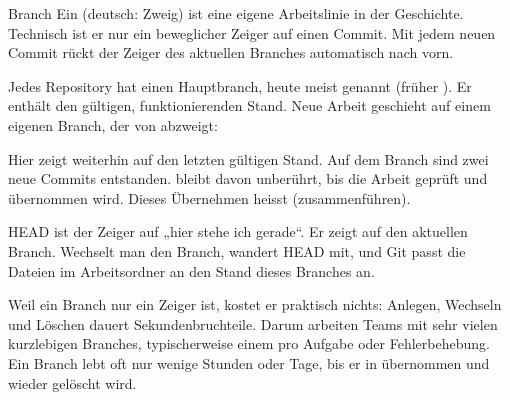 \begin{definition}{Branch}
Ein  (deutsch: Zweig) ist eine eigene Arbeitslinie in der Geschichte.
Technisch ist er nur ein beweglicher Zeiger auf einen Commit. Mit jedem neuen Commit rückt
der Zeiger des aktuellen Branches automatisch nach vorn.
\end{definition}

Jedes Repository hat einen Hauptbranch, heute meist  genannt (früher
). Er enthält den gültigen, funktionierenden Stand. Neue Arbeit geschieht auf
einem eigenen Branch, der von  abzweigt:

\begin{center}
\end{center}

Hier zeigt  weiterhin auf den letzten gültigen Stand. Auf dem Branch 
sind zwei neue Commits entstanden.  bleibt davon unberührt, bis die Arbeit
geprüft und übernommen wird. Dieses Übernehmen heisst  (zusammenführen).

\begin{definition}{HEAD}
 ist der Zeiger auf „hier stehe ich gerade“. Er zeigt auf den aktuellen
Branch. Wechselt man den Branch, wandert HEAD mit, und Git passt die Dateien im
Arbeitsordner an den Stand dieses Branches an.
\end{definition}

\begin{praxis}
Weil ein Branch nur ein Zeiger ist, kostet er praktisch nichts: Anlegen, Wechseln und
Löschen dauert Sekundenbruchteile. Darum arbeiten Teams mit sehr vielen kurzlebigen
Branches, typischerweise einem pro Aufgabe oder Fehlerbehebung. Ein Branch lebt oft nur
wenige Stunden oder Tage, bis er in  übernommen und wieder gelöscht wird.
\end{praxis}

